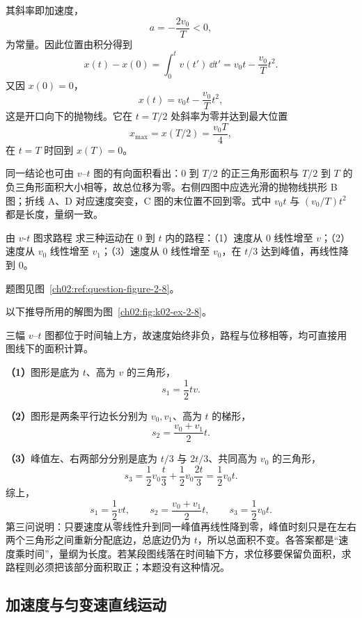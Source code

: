 {\begin{xesolution}
其斜率即加速度，
\[
 a=-\frac{2v_0}{T}<0,
\]
为常量。因此位置由积分得到
\[
 x(t)-x(0)=\int_0^t v(t')\,\dd t'
 =v_0t-\frac{v_0}{T}t^2.
\]
又因 $x(0)=0$，
\[
 \boxed{x(t)=v_0t-\frac{v_0}{T}t^2},
\]
这是开口向下的抛物线。它在 $t=T/2$ 处斜率为零并达到最大位置
\[
 x_{\max}=x(T/2)=\frac{v_0T}{4},
\]
在 $t=T$ 时回到 $x(T)=0$。

同一结论也可由 $v$--$t$ 图的有向面积看出：$0$ 到 $T/2$ 的正三角形面积与 $T/2$ 到 $T$ 的负三角形面积大小相等，故总位移为零。右侧四图中应选光滑的抛物线拱形 B 图；折线 A、D 对应速度突变，C 图的末位置不回到零。式中 $v_0t$ 与 $(v_0/T)t^2$ 都是长度，量纲一致。
\end{xesolution}

\begin{origexamplebox}{由 $v$-$t$ 图求路程}\label{ch02:ex:k02-2-8}
求三种运动在 $0$ 到 $t$ 内的路程：（1）速度从 $0$ 线性增至 $v$；（2）速度从 $v_0$ 线性增至 $v_1$；（3）速度从 $0$ 线性增至 $v_0$，在 $t/3$ 达到峰值，再线性降到 $0$。
\par 题图见图~\ref{ch02:ref:question-figure-2-8}。
\KQuestionAI
\end{origexamplebox}
\begin{xesolution}
以下推导所用的解图为图~\ref{ch02:fig:k02-ex-2-8}。

三幅 $v$--$t$ 图都位于时间轴上方，故速度始终非负，路程与位移相等，均可直接用图线下的面积计算。


\ExampleTwoEightGraphs
\textbf{（1）}图形是底为 $t$、高为 $v$ 的三角形，
\[
 s_1=\frac12tv.
\]

\textbf{（2）}图形是两条平行边长分别为 $v_0,v_1$、高为 $t$ 的梯形，
\[
 s_2=\frac{v_0+v_1}{2}t.
\]

\textbf{（3）}峰值左、右两部分分别是底为 $t/3$ 与 $2t/3$、共同高为 $v_0$ 的三角形，
\[
 s_3=\frac12v_0\frac t3+\frac12v_0\frac{2t}{3}
 =\frac12v_0t.
\]
综上，
\[
  \boxed{s_1=\frac12vt},\qquad
  \boxed{s_2=\frac{v_0+v_1}{2}t},\qquad
  \boxed{s_3=\frac12v_0t}.
\]
第三问说明：只要速度从零线性升到同一峰值再线性降到零，峰值时刻只是在左右两个三角形之间重新分配底边，总底边仍为 $t$，所以总面积不变。各答案都是“速度乘时间”，量纲为长度。若某段图线落在时间轴下方，求位移要保留负面积，求路程则必须把该部分面积取正；本题没有这种情况。
\end{xesolution}

\subsection{加速度与匀变速直线运动}

}
